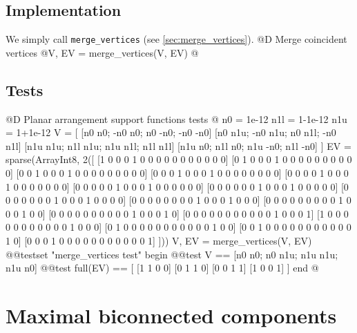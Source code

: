 \documentclass[10pt,oneside]{article}
\begin{document}
\subsection{Implementation}
We simply call \texttt{merge\_vertices} (see \ref{sec:merge_vertices}).
@D Merge coincident vertices
@{V, EV = merge_vertices(V, EV)
@}
\subsection{Tests}
@D Planar arrangement support functions tests
@{
n0 = 1e-12
n1l = 1-1e-12
n1u = 1+1e-12
V = [
    [n0 n0; -n0 n0; n0 -n0; -n0 -n0]
    [n0 n1u; -n0 n1u; n0 n1l; -n0 n1l]
    [n1u n1u; n1l n1u; n1u n1l; n1l n1l]
    [n1u n0; n1l n0; n1u -n0; n1l -n0]
]
EV = sparse(Array{Int8, 2}([
    [1 0 0 0 1 0 0 0 0 0 0 0 0 0 0 0]
    [0 1 0 0 0 1 0 0 0 0 0 0 0 0 0 0]
    [0 0 1 0 0 0 1 0 0 0 0 0 0 0 0 0]
    [0 0 0 1 0 0 0 1 0 0 0 0 0 0 0 0]
    [0 0 0 0 1 0 0 0 1 0 0 0 0 0 0 0]
    [0 0 0 0 0 1 0 0 0 1 0 0 0 0 0 0]
    [0 0 0 0 0 0 1 0 0 0 1 0 0 0 0 0]
    [0 0 0 0 0 0 0 1 0 0 0 1 0 0 0 0]
    [0 0 0 0 0 0 0 0 1 0 0 0 1 0 0 0]
    [0 0 0 0 0 0 0 0 0 1 0 0 0 1 0 0]
    [0 0 0 0 0 0 0 0 0 0 1 0 0 0 1 0]
    [0 0 0 0 0 0 0 0 0 0 0 1 0 0 0 1]
    [1 0 0 0 0 0 0 0 0 0 0 0 1 0 0 0]
    [0 1 0 0 0 0 0 0 0 0 0 0 0 1 0 0]
    [0 0 1 0 0 0 0 0 0 0 0 0 0 0 1 0]
    [0 0 0 1 0 0 0 0 0 0 0 0 0 0 0 1]
]))
V, EV = merge_vertices(V, EV)
@@testset "merge_vertices test" begin
    @@test V == [n0 n0; n0 n1u; n1u n1u; n1u n0]
    @@test full(EV) == [
        [1 1 0 0]
        [0 1 1 0]
        [0 0 1 1]
        [1 0 0 1]
    ]
end
@}




\section{Maximal biconnected components}
\end{document}
